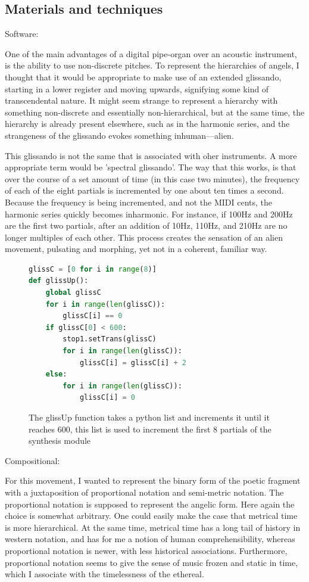 \documentclass[12pt,twoside,maitrise]{dms_ks}
\theoremstyle{definition}
\begin{document}
{\subsection{Materials and techniques}

Software:

One of the main advantages of a digital pipe-organ over an acoustic instrument, is the ability to use non-discrete pitches.
To represent the hierarchies of angels, I thought that it would be appropriate to make use of an extended glissando, starting in a lower register and moving upwards, signifying some kind of transcendental nature.
It might seem strange to represent a hierarchy with something non-discrete and essentially non-hierarchical, but at the same time, the hierarchy is already present elsewhere, such as in the harmonic series, and the strangeness of the glissando evokes something inhuman---alien.

This glissando is not the same that is associated with oher instruments. A more appropriate term would be 'spectral glissando'. The way that this works, is that over the course of a set amount of time (in this case two minutes), the frequency of each of the eight partials is incremented by one about ten times a second.
Because the frequency is being incremented, and not the MIDI cents, the harmonic series quickly becomes inharmonic.
For instance, if 100Hz and 200Hz are the first two partials, after an addition of 10Hz, 110Hz, and 210Hz are no longer multiples of each other.
This process creates the sensation of an alien movement, pulsating and morphing, yet not in a coherent, familiar way.    

\begin{figure}[H]
\begin{lstlisting}[language=Python]
glissC = [0 for i in range(8)]
def glissUp():
    global glissC
    for i in range(len(glissC)):
        glissC[i] == 0
    if glissC[0] < 600:
        stop1.setTrans(glissC)
        for i in range(len(glissC)):
            glissC[i] = glissC[i] + 2
    else:
        for i in range(len(glissC)):
            glissC[i] = 0
\end{lstlisting}
\caption{The glissUp function takes a python list and increments it until it reaches 600, this list is used to increment the first 8 partials of the synthesis module}
\end{figure}

Compositional:

For this movement, I wanted to represent the binary form of the poetic fragment with a juxtaposition of proportional notation and semi-metric notation.
The proportional notation is supposed to represent the angelic form.
Here again the choice is somewhat arbitrary.
One could easily make the case that metrical time is more hierarchical.
At the same time, metrical time has a long tail of history in western notation, and has for me a notion of human comprehensibility, whereas proportional notation is newer, with less historical associations.
Furthermore, proportional notation seems to give the sense of music frozen and static in time, which I associate with the timelessness of the ethereal.

}
\end{document}

